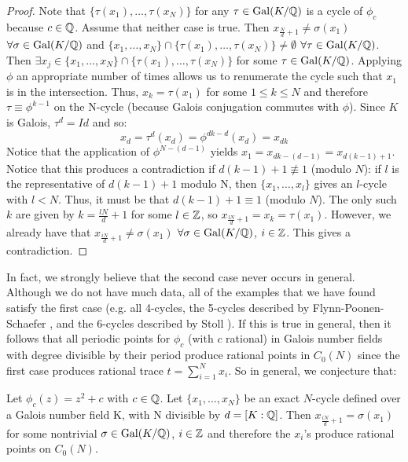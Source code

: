 \begin{proof}
	Note that $\{\tau(x_1), \ldots, \tau(x_{N})\}$ for any $\tau \in 
	\mathrm{Gal}(K/\mathbb{Q})$ is a cycle of $\phi_c$ because $c \in \mathbb{Q}$. Assume 
	that neither case is true. Then $x_{\frac{N}{d}+1} \neq \sigma(
	x_1)$ $\forall \sigma \in \mathrm{Gal}(K/\mathbb{Q})$ and $\{x_1, \ldots, x_{N}\} 
	\cap \{\tau(x_1), \ldots, \tau(x_{N})\} \neq \emptyset$ $\forall 
	\tau \in \mathrm{Gal}(K/\mathbb{Q})$. Then $\exists x_j \in \{x_1, \ldots, x_{N}\}
	\cap \{\tau(x_1), \ldots, \tau(x_{N})\}$ for some $\tau \in \mathrm{Gal}(K/
	\mathbb{Q})$. Applying $\phi$ an appropriate number of times allows us to 
	renumerate the cycle	such that $x_1$ is in the intersection. 
	Thus, $x_k = \tau(x_1)$ for some $1 \leq k \leq N$ and therefore $
	\tau \equiv \phi^{k-1}$ on the N-cycle (because Galois conjugation 
	commutes with $\phi$). Since $K$ is Galois, $\tau^d = Id$ and so:
	\[
		x_d = \tau^d(x_d) = \phi^{dk-d}(x_d) = x_{dk}
	\]
	Notice that the application of $\phi^{N-(d-1)}$ yields $x_1 =
	x_{dk-(d-1)} = x_{d(k-1) + 1}$. Notice that this produces a
	contradiction if $d(k-1) + 1 \not\equiv 1$ (modulo $N$): if $l$
	is the representative of $d(k-1) + 1$ modulo N, then $\{x_1, \ldots
	, x_l\}$ gives an $l$-cycle with $l < N$. Thus, it must be that
	$d(k-1) + 1 \equiv 1$ (modulo $N$). The only such $k$ are given
	by $k = \frac{lN}{d} + 1$ for some $l \in \mathbb{Z}$, so $x_{\frac{lN}{d}
	+ 1} = x_k = \tau(x_1)$.	However, we already have that
	$x_{\frac{iN}{d}+1} \neq \sigma(x_1)$ $\forall \sigma \in \mathrm{Gal}(K/\mathbb{Q})$,
	$i \in \mathbb{Z}$. This gives a contradiction.
\end{proof}

In fact, we strongly believe that the second case never occurs in general.
Although we do not have much data, all of the examples that we have found
satisfy the first case (e.g. all 4-cycles, the 5-cycles described by
Flynn-Poonen-Schaefer \cite{MR1480542}, and the 6-cycles described by
Stoll \cite{MR2465796}). If this is true in general, then it follows that
all periodic points for $\phi_c$ (with $c$ rational) in Galois number fields
with degree divisible by their period produce rational points in $C_0(N)$
since the first case produces rational trace $t = \sum\limits_{i=1}^N x_i$.
So in general, we conjecture that:

\begin{conjecture}
	Let $\phi_c(z) = z^2 + c$ with $c \in \mathbb{Q}$. Let $\{x_1, \ldots, x_{N}\}$ be
	an exact $N$-cycle defined over a Galois number field K, with N 
	divisible by	$d = [K:\mathbb{Q} ]$. Then $x_{\frac{iN}{d}+1} = \sigma(x_1)$
	for some nontrivial $\sigma \in \mathrm{Gal}(K/\mathbb{Q})$, $i \in \mathbb{Z}$ and therefore the
	$x_i$'s produce rational points on $C_0(N)$.
\end{conjecture}

